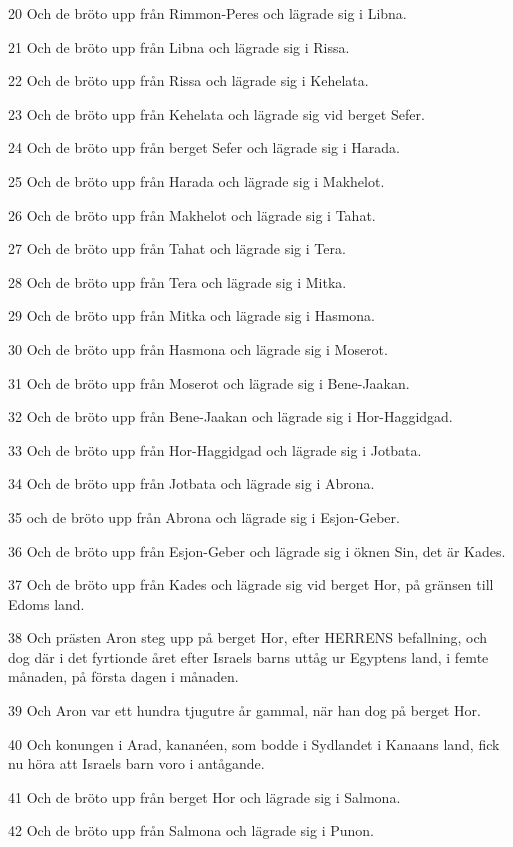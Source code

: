 \par 20 Och de bröto upp från Rimmon-Peres och lägrade sig i Libna.
\par 21 Och de bröto upp från Libna och lägrade sig i Rissa.
\par 22 Och de bröto upp från Rissa och lägrade sig i Kehelata.
\par 23 Och de bröto upp från Kehelata och lägrade sig vid berget Sefer.
\par 24 Och de bröto upp från berget Sefer och lägrade sig i Harada.
\par 25 Och de bröto upp från Harada och lägrade sig i Makhelot.
\par 26 Och de bröto upp från Makhelot och lägrade sig i Tahat.
\par 27 Och de bröto upp från Tahat och lägrade sig i Tera.
\par 28 Och de bröto upp från Tera och lägrade sig i Mitka.
\par 29 Och de bröto upp från Mitka och lägrade sig i Hasmona.
\par 30 Och de bröto upp från Hasmona och lägrade sig i Moserot.
\par 31 Och de bröto upp från Moserot och lägrade sig i Bene-Jaakan.
\par 32 Och de bröto upp från Bene-Jaakan och lägrade sig i Hor-Haggidgad.
\par 33 Och de bröto upp från Hor-Haggidgad och lägrade sig i Jotbata.
\par 34 Och de bröto upp från Jotbata och lägrade sig i Abrona.
\par 35 och de bröto upp från Abrona och lägrade sig i Esjon-Geber.
\par 36 Och de bröto upp från Esjon-Geber och lägrade sig i öknen Sin, det är Kades.
\par 37 Och de bröto upp från Kades och lägrade sig vid berget Hor, på gränsen till Edoms land.
\par 38 Och prästen Aron steg upp på berget Hor, efter HERRENS befallning, och dog där i det fyrtionde året efter Israels barns uttåg ur Egyptens land, i femte månaden, på första dagen i månaden.
\par 39 Och Aron var ett hundra tjugutre år gammal, när han dog på berget Hor.
\par 40 Och konungen i Arad, kananéen, som bodde i Sydlandet i Kanaans land, fick nu höra att Israels barn voro i antågande.
\par 41 Och de bröto upp från berget Hor och lägrade sig i Salmona.
\par 42 Och de bröto upp från Salmona och lägrade sig i Punon.

